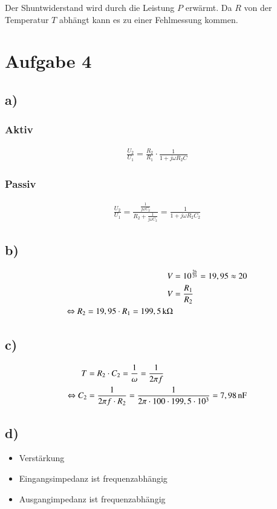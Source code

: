 Der Shuntwiderstand wird durch die Leistung $P$ erwärmt. Da $R$ von der Temperatur $T$ abhängt kann es zu einer Fehlmessung kommen.


\section{Aufgabe 4}

\subsection*{a)}

\subsubsection*{Aktiv}

\begin{align*}
\frac{U_2}{U_1} = \frac{R_2}{R_1} \cdot \frac{1}{1 + j \omega R_2 C}
\end{align*}


\subsubsection*{Passiv}

\begin{align*}
\frac{U_2}{U_1} = \frac{\frac{1}{j \omega C_2}}{R_2 + \frac{1}{j \omega C_2}} = \frac{1}{1 + j \omega R_2 C_2}
\end{align*}


\subsection*{b)}

\begin{align*}
V &= 10^{\frac{26}{20}} = 19,95 \approx 20 \\
V &= \frac{R_1}{R_2} \\
\Leftrightarrow R_2 = 19,95 \cdot R_1 = \unit[199,5]{k \Omega}
\end{align*}


\subsection*{c)}

\begin{align*}
T &= R_2 \cdot C_2 = \frac{1}{\omega} = \frac{1}{2 \pi f} \\
\Leftrightarrow C_2 &= \frac{1}{2 \pi f \cdot R_2} = \frac{1}{2 \pi \cdot 100 \cdot 199,5 \cdot 10^3} = \unit[7,98]{nF}
\end{align*}


\subsection*{d)}

\begin{itemize}
	\item Verstärkung
	\item Eingangsimpedanz ist frequenzabhängig
	\item Ausgangimpedanz ist frequenzabhängig
\end{itemize}



















